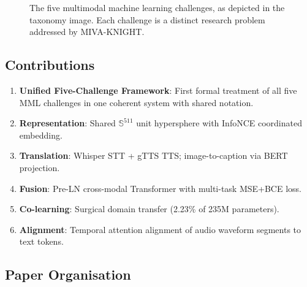 \documentclass[12pt,a4paper]{article}
\theoremstyle{definition}
\theoremstyle{plain}
\theoremstyle{remark}
\newcommand{\Sph}{\mathbb{S}}
\newcommand{\MA}{\mathcal{M}_A}
\newcommand{\MB}{\mathcal{M}_B}
\begin{document}
\begin{figure}[H]
{
}
\caption{The five multimodal machine learning challenges, as depicted in the taxonomy image. Each challenge is a distinct research problem addressed by MIVA-KNIGHT.}
\label{fig:mml_overview}
\end{figure}

\subsection{Contributions}

\begin{tcolorbox}[keybox,title={Summary of Contributions}]
\begin{enumerate}[label=\textbf{C\arabic*.}]
  \item \textbf{Unified Five-Challenge Framework}: First formal treatment of all five MML challenges in one coherent system with shared notation.
  \item \textbf{Representation}: Shared $\Sph^{511}$ unit hypersphere with InfoNCE coordinated embedding.
  \item \textbf{Translation}: Whisper STT + gTTS TTS; image-to-caption via BERT projection.
  \item \textbf{Fusion}: Pre-LN cross-modal Transformer with multi-task MSE+BCE loss.
  \item \textbf{Co-learning}: Surgical domain transfer (2.23\% of 235M parameters).
  \item \textbf{Alignment}: Temporal attention alignment of audio waveform segments to text tokens.
\end{enumerate}
\end{tcolorbox}

\subsection{Paper Organisation}
\end{document}
